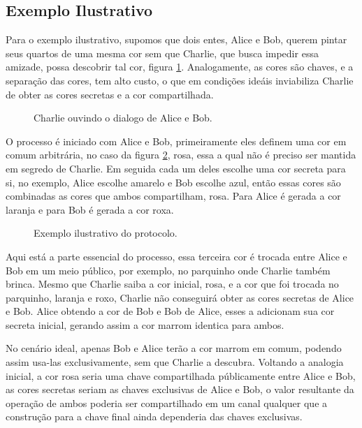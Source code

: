 \documentclass{article}
\begin{document}
\subsection{Exemplo Ilustrativo}
\label{sub:exemplo_ilustrativo}
Para o exemplo ilustrativo, supomos que dois entes, Alice e Bob, querem pintar
seus quartos de uma mesma cor sem que Charlie, que busca impedir essa amizade,
possa descobrir tal cor, figura \ref{fig:abc}. Analogamente, as cores são
chaves, e a separação das cores, tem alto custo, o que em condições ideáis
inviabiliza Charlie de obter as cores secretas e a cor compartilhada.

\begin{figure}[htpb]
    \centering
    
    \caption{Charlie ouvindo o dialogo de Alice e Bob.}%
    \label{fig:abc}
\end{figure}

O processo é iniciado com Alice e Bob, primeiramente eles definem
uma cor em comum arbitrária, no caso da figura \ref{fig:diagram}, rosa, essa
a qual não é preciso ser mantida em segredo de Charlie. Em seguida cada um deles
escolhe uma cor secreta para si, no exemplo, Alice escolhe amarelo e Bob
escolhe azul, então essas cores são combinadas as cores que ambos compartilham,
rosa. Para Alice é gerada a cor laranja e para Bob é gerada a cor roxa.

\begin{figure}[htpb]
    \centering
    
    \caption{Exemplo ilustrativo do protocolo.}%
    \label{fig:diagram}
\end{figure}

Aqui está a parte essencial do processo, essa terceira cor é trocada entre
Alice e Bob em um meio público, por exemplo, no parquinho onde Charlie também
brinca. Mesmo que Charlie saiba a cor inicial, rosa, e a cor que foi trocada no
parquinho, laranja e roxo, Charlie não conseguirá obter as cores secretas de
Alice e Bob. Alice obtendo a cor de Bob e Bob de Alice, esses a adicionam sua
cor secreta inicial, gerando assim a cor marrom identica para ambos.

No cenário ideal, apenas Bob e Alice terão a cor marrom em comum, podendo assim
usa-las exclusivamente, sem que Charlie a descubra. Voltando a analogia inicial,
a cor rosa seria uma chave compartilhada públicamente entre Alice e Bob, as
cores secretas seriam as chaves exclusivas de Alice e Bob, o valor resultante
da operação de ambos poderia ser compartilhado em um canal qualquer que a
construção para a chave final ainda dependeria das chaves exclusivas.
\end{document}
